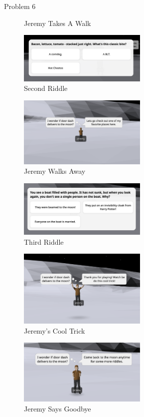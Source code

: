 \begin{problem}{Problem 6}
\begin{figure}[ht]
        \caption{Jeremy Takes A Walk}
    \end{figure}
    \begin{figure}[ht]
        \centering
        \includegraphics[width=0.55\textwidth]{./Images/Second Riddle.png}
        \caption{Second Riddle}
    \end{figure}
    \begin{figure}[ht]
        \centering
        \includegraphics[width=0.55\textwidth]{./Images/Walking Away.png}
        \caption{Jeremy Walks Away}
    \end{figure}
    \clearpage
    \begin{figure}[ht]
        \centering
        \includegraphics[width=0.55\textwidth]{./Images/Third Riddle.png}
        \caption{Third Riddle}
    \end{figure}
    \begin{figure}[ht]
        \centering
        \includegraphics[width=0.55\textwidth]{./Images/Cool Trick.png}
        \caption{Jeremy's Cool Trick}
    \end{figure}
    \begin{figure}[ht]
        \centering
        \includegraphics[width=0.55\textwidth]{./Images/Goodbye.png}
        \caption{Jeremy Says Goodbye}
    \end{figure}
\end{problem}